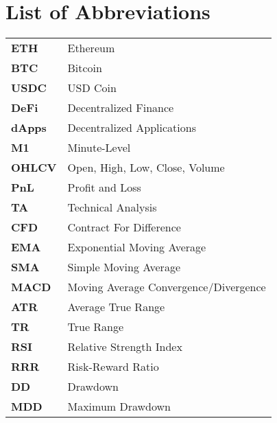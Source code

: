 \section*{List of Abbreviations}

\begin{tabularx}{\textwidth}{@{}lL{0.8\textwidth}@{}}
    \textbf{ETH}  & Ethereum                              \\
    \textbf{BTC}  & Bitcoin                               \\
    \textbf{USDC} & USD Coin                              \\
    \textbf{DeFi}   & Decentralized Finance                 \\
    \textbf{dApps}  & Decentralized Applications            \\
    \textbf{M1}   & Minute-Level                          \\
    \textbf{OHLCV}  & Open, High, Low, Close, Volume        \\


    \textbf{PnL}  & Profit and Loss                       \\
    \textbf{TA}   & Technical Analysis                    \\
    \textbf{CFD}  & Contract For Difference               \\
    \textbf{EMA}  & Exponential Moving Average            \\
    \textbf{SMA}  & Simple Moving Average                 \\
    \textbf{MACD} & Moving Average Convergence/Divergence \\
    \textbf{ATR}  & Average True Range                    \\
    \textbf{TR}   & True Range                            \\
    \textbf{RSI}  & Relative Strength Index               \\
    \textbf{RRR}  & Risk-Reward Ratio                     \\
    \textbf{DD}   & Drawdown                              \\
    \textbf{MDD}  & Maximum Drawdown                      \\


\end{tabularx}
